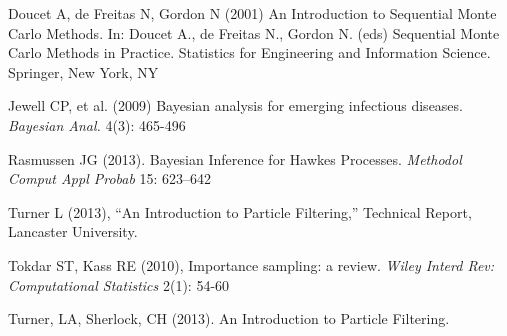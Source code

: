 \documentclass[11pt,a4paper]{article}
\begin{document}
\begin{thebibliography}{99}
 Doucet A, de Freitas N, Gordon N (2001) An Introduction to Sequential Monte Carlo Methods. In: Doucet A., de Freitas N., Gordon N. (eds) Sequential Monte Carlo Methods in Practice. Statistics for Engineering and Information Science. Springer, New York, NY

 Jewell CP, et al. (2009) Bayesian analysis for emerging infectious diseases. \textit{Bayesian Anal.} 4(3): 465-496

 Rasmussen JG (2013). Bayesian Inference for Hawkes Processes. \textit{Methodol Comput Appl Probab} 15: 623–642


 Turner L (2013), “An Introduction to Particle Filtering,” Technical Report, Lancaster University.


 Tokdar ST, Kass RE (2010), Importance sampling: a review. \textit{Wiley Interd Rev: Computational Statistics} 2(1): 54-60

 Turner, LA, Sherlock, CH (2013). An Introduction to Particle Filtering.


\end{thebibliography}
\end{document}

